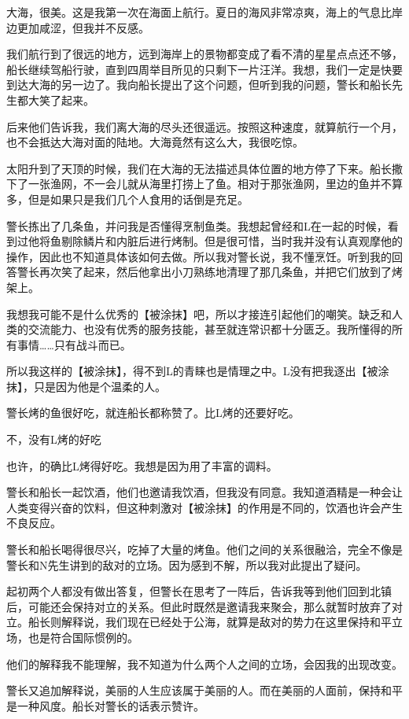 大海，很美。这是我第一次在海面上航行。夏日的海风非常凉爽，海上的气息比岸边更加咸涩，但我并不反感。

我们航行到了很远的地方，远到海岸上的景物都变成了看不清的星星点点还不够，船长继续驾船行驶，直到四周举目所见的只剩下一片汪洋。我想，我们一定是快要到达大海的另一边了。我向船长提出了这个问题，但听到我的问题，警长和船长先生都大笑了起来。

后来他们告诉我，我们离大海的尽头还很遥远。按照这种速度，就算航行一个月，也不会抵达大海对面的陆地。大海竟然有这么大，我很吃惊。

太阳升到了天顶的时候，我们在大海的无法描述具体位置的地方停了下来。船长撒下了一张渔网，不一会儿就从海里打捞上了鱼。相对于那张渔网，里边的鱼并不算多，但是如果只是我们几个人食用的话倒是充足。

警长拣出了几条鱼，并问我是否懂得烹制鱼类。我想起曾经和L在一起的时候，看到过他将鱼剔除鳞片和内脏后进行烤制。但是很可惜，当时我并没有认真观摩他的操作，因此也不知道具体该如何去做。所以我对警长说，我不懂烹饪。听到我的回答警长再次笑了起来，然后他拿出小刀熟练地清理了那几条鱼，并把它们放到了烤架上。

我想我可能不是什么优秀的【被涂抹】吧，所以才接连引起他们的嘲笑。缺乏和人类的交流能力、也没有优秀的服务技能，甚至就连常识都十分匮乏。我所懂得的所有事情……只有战斗而已。

所以我这样的【被涂抹】，得不到L的青睐也是情理之中。L没有把我逐出【被涂抹】，只是因为他是个温柔的人。

警长烤的鱼很好吃，就连船长都称赞了。比L烤的还要好吃。

不，没有L烤的好吃

也许，的确比L烤得好吃。我想是因为用了丰富的调料。

警长和船长一起饮酒，他们也邀请我饮酒，但我没有同意。我知道酒精是一种会让人类变得兴奋的饮料，但这种刺激对【被涂抹】的作用是不同的，饮酒也许会产生不良反应。

警长和船长喝得很尽兴，吃掉了大量的烤鱼。他们之间的关系很融洽，完全不像是警长和N先生讲到的敌对的立场。因为感到不解，所以我对此提出了疑问。

起初两个人都没有做出答复，但警长在思考了一阵后，告诉我等到他们回到北镇后，可能还会保持对立的关系。但此时既然是邀请我来聚会，那么就暂时放弃了对立。船长则解释说，我们现在已经处于公海，就算是敌对的势力在这里保持和平立场，也是符合国际惯例的。

他们的解释我不能理解，我不知道为什么两个人之间的立场，会因我的出现改变。

警长又追加解释说，美丽的人生应该属于美丽的人。而在美丽的人面前，保持和平是一种风度。船长对警长的话表示赞许。

